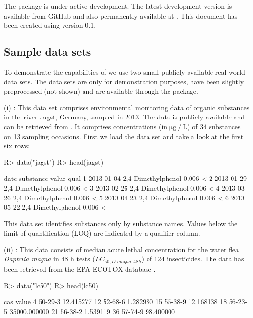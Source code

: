 \documentclass[article, shortnames]{jss}\usepackage[]{graphicx}\usepackage[]{color}
\begin{document}
\begin{CodeChunk}
\end{CodeChunk}


The package is under active development. The latest development version is available from GitHub and also permanently available at \citet{zenodo}.
This document has been created using  version 0.1.


\subsection[Sample data sets]{Sample data sets}
To demonstrate the capabilities of   we use two small publicly available real world data sets.
The data sets are only for demonstration purposes, have been slightly preprocessed (not shown) and are available through the package.

(i) : This data set comprises environmental monitoring data of organic substances in the river Jagst, Germany, sampled in 2013.
The data is publicly available and can be retrieved from .
It comprises concentrations  (in $\mathrm{\mu g~/~L}$) of  34 substances  on 13 sampling occasions.
First we load the data set and take a look at the first six rows:

\begin{CodeChunk}
\begin{CodeInput}
R> data("jagst")
R> head(jagst)
\end{CodeInput}
\begin{CodeOutput}
        date          substance value qual
1 2013-01-04 2,4-Dimethylphenol 0.006    <
2 2013-01-29 2,4-Dimethylphenol 0.006    <
3 2013-02-26 2,4-Dimethylphenol 0.006    <
4 2013-03-26 2,4-Dimethylphenol 0.006    <
5 2013-04-23 2,4-Dimethylphenol 0.006    <
6 2013-05-22 2,4-Dimethylphenol 0.006    <
\end{CodeOutput}
\end{CodeChunk}

This data set identifies substances only by substance names. Values below the limit of quantification (LOQ) are indicated by a qualifier column.

(ii) : This data consists of median acute lethal concentration for the water flea \textit{Daphnia magna} in 48 h tests ($LC_{50, D.magna, 48h}$) of 124 insecticides.
The data has been retrieved from the EPA ECOTOX database \citep{epa_2016}.

\begin{CodeChunk}
\begin{CodeInput}
R> data("lc50")
R> head(lc50)
\end{CodeInput}
\begin{CodeOutput}
       cas        value
4  50-29-3    12.415277
12 52-68-6     1.282980
15 55-38-9    12.168138
18 56-23-5 35000.000000
21 56-38-2     1.539119
36 57-74-9    98.400000
\end{CodeOutput}
\end{CodeChunk}
\end{document}
